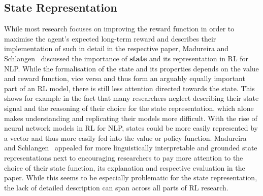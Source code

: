 \documentclass[11pt]{article}
\begin{document}
\subsection{State Representation}\label{state}
While most research focuses on improving the reward function in order to maximise the agent's expected long-term reward and describes their implementation of such in detail in the respective paper, Madureira and Schlangen~ discussed the importance of \textbf{state} and its representation in RL for NLP. While the formalisation of the state and its properties depends on the value and reward function, vice versa and thus form an arguably equally important part of an RL model, there is still less attention directed towards the state. This shows for example in the fact that many researchers neglect describing their state signal and the reasoning of their choice for the state representation, which alone makes understanding and replicating their models more difficult. With the rise of neural network models in RL for NLP, states could be more easily represented by a vector and thus more easily fed into the value or policy function. Madureira and Schlangen~ appealed for more linguistically interpretable and grounded state representations next to encouraging researchers to pay more attention to the choice of their state function, its explanation and respective evaluation in the paper. While this seems to be especially problematic for the state representation, the lack of detailed description can span across all parts of RL research.
\end{document}
